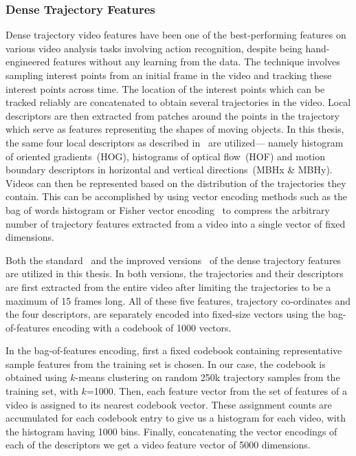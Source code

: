 \subsubsection{Dense Trajectory Features}

Dense trajectory video features have been one of the best-performing features
on various video analysis tasks involving action recognition, despite being
hand-engineered features without any learning from the data.
The technique involves sampling interest points from an initial frame in the
video and tracking these interest points across time.
The location of the interest points which can be tracked reliably are concatenated
to obtain several trajectories in the video.
Local descriptors are then extracted from patches around the points in the
trajectory which serve as features representing the shapes of moving objects.
In this thesis, the same four local descriptors as described
in~\cite{DBLP:conf/cvpr/WangKSL11, Wang2013} are utilized--- namely histogram of
oriented gradients~(HOG), histograms of optical flow~(HOF) and motion boundary
descriptors in horizontal and vertical directions~(MBHx \& MBHy).
Videos can then be represented based on the distribution of the trajectories
they contain.
This can be accomplished by using vector encoding methods such as the bag of
words histogram or Fisher vector encoding~\cite{perronnin2010improving} to
compress the arbitrary number of trajectory features extracted from a video into
a single vector of fixed dimensions.

Both the standard~\cite{DBLP:conf/cvpr/WangKSL11} and the improved
versions~\cite{Wang2013} of the dense trajectory features are utilized in this
thesis.
In both versions, the trajectories and their descriptors are first extracted
from the entire video after limiting the trajectories to be a maximum of 15
frames long.
All of these five features, trajectory co-ordinates and the four descriptors,
are separately encoded into fixed-size vectors using the bag-of-features encoding
with a codebook of 1000 vectors.

In the bag-of-features encoding, first a fixed codebook containing representative
sample features from the training set is chosen.
In our case, the codebook is obtained using $k$-means clustering on random 250k
trajectory samples from the training set, with $k$=1000.
Then, each feature vector from the set of features of a video is assigned to its
nearest codebook vector.
These assignment counts are accumulated for each codebook entry to give us a
histogram for each video, with the histogram having 1000 bins.
Finally, concatenating the vector encodings of each of the descriptors we get a
video feature vector of 5000 dimensions. 

